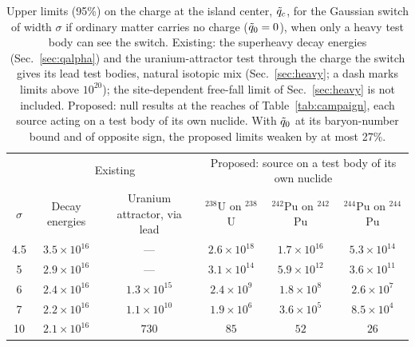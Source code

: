 \begin{table}[!htbp]
\caption{\label{tab:heavy}Upper limits (95\%) on the charge at the island center, $\tilde q_c$, for the Gaussian switch of
width $\sigma$ if ordinary matter carries no charge ($\tilde q_0=0$), when only a heavy test body can see the switch.
Existing: the superheavy decay energies (Sec.~\ref{sec:qalpha}) and the uranium-attractor test through the charge
the switch gives its lead test bodies, natural isotopic mix (Sec.~\ref{sec:heavy}; a dash marks limits above
$10^{20}$); the site-dependent free-fall limit of Sec.~\ref{sec:heavy} is not included. Proposed: null
results at the reaches of Table~\ref{tab:campaign}, each source acting on a test body of its own nuclide. With
$\tilde q_0$ at its baryon-number bound and of opposite sign, the proposed limits weaken by at most 27\%.}
\begin{ruledtabular}
\begin{tabular}{cccccc}
 & \multicolumn{2}{c}{Existing} & \multicolumn{3}{c}{Proposed: source on a test body of its own nuclide}\\
$\sigma$ & Decay energies & Uranium attractor, via lead & $^{238}$U on $^{238}$U & $^{242}$Pu on $^{242}$Pu &
$^{244}$Pu on $^{244}$Pu\\
\hline
4.5 & $3.5\times10^{16}$ & --- & $2.6\times10^{18}$ & $1.7\times10^{16}$ & $5.3\times10^{14}$ \\
5 & $2.9\times10^{16}$ & --- & $3.1\times10^{14}$ & $5.9\times10^{12}$ & $3.6\times10^{11}$ \\
6 & $2.4\times10^{16}$ & $1.3\times10^{15}$ & $2.4\times10^{9}$ & $1.8\times10^{8}$ & $2.6\times10^{7}$ \\
7 & $2.2\times10^{16}$ & $1.1\times10^{10}$ & $1.9\times10^{6}$ & $3.6\times10^{5}$ & $8.5\times10^{4}$ \\
10 & $2.1\times10^{16}$ & $730$ & $85$ & $52$ & $26$ \\
\end{tabular}
\end{ruledtabular}
\end{table}
